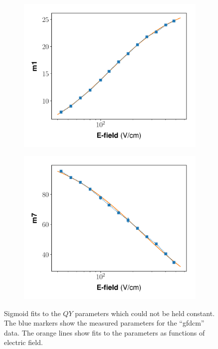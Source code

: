 \begin{figure}[h!]
\begin{subfigure}{0.45\textwidth}
  \centering
  \includegraphics[width=\textwidth]{Figures/Yields_fit_old/NEST_m1_fit_old.pdf}
  \caption{}
\end{subfigure}%
\begin{subfigure}{0.45\textwidth}
  \centering
  \includegraphics[width=\textwidth]{Figures/Yields_fit_old/NEST_m7_fit_old.pdf}
  \caption{}
\end{subfigure}
\caption{Sigmoid fits to the $QY$ parameters which could not be held constant. The blue markers show the measured parameters for the ``gfdcm'' data. The orange lines show fits to the parameters as functions of electric field.}
\label{fig:gfdcm_prelim_params}
\end{figure}

